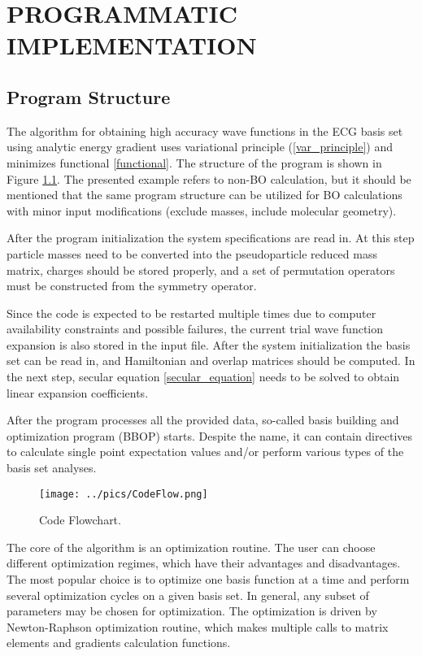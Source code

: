 \chapter{PROGRAMMATIC IMPLEMENTATION\label{prog}}

\section{Program Structure}

The algorithm for obtaining high accuracy wave functions
in the ECG basis set using analytic energy gradient
uses variational principle (\ref{var_principle})
and minimizes functional \ref{functional}.
The structure of the program is shown in Figure \ref{codeflow}.
The presented example refers to non-BO calculation,
but it should be mentioned that the same program structure can be 
utilized for BO calculations with minor input modifications
(exclude masses, include molecular geometry). 

After the program initialization the system specifications
are read in. At this step particle masses need to be 
converted into the pseudoparticle reduced mass matrix,
charges should be stored properly, and a set of 
permutation operators must be constructed from the
symmetry operator.

Since the code is expected to be restarted multiple times
due to computer availability constraints and possible
failures, the current trial wave function expansion
is also stored in the input file. After the system
initialization the basis set can be read in, and 
Hamiltonian and overlap matrices should be computed.
In the next step, secular equation \ref{secular_equation}
needs to be solved to obtain linear expansion coefficients.

After the program processes all the provided data, 
so-called basis building and optimization program (BBOP)
starts. Despite the name, it can contain directives to
calculate single point expectation values and/or perform
various types of the basis set analyses.

\begin{figure}[H]
\begin{center}
\texttt{[image: ../pics/CodeFlow.png]}
\caption[Code Flowchart]{Code Flowchart. \label{codeflow}}
\end{center}
\end{figure}

The core of the algorithm is an optimization routine.
The user can choose different optimization regimes,
which have their advantages and disadvantages. The most
popular choice is to optimize one basis function at a time
and perform several optimization cycles on a given basis
set. In general, any subset of parameters may be chosen for 
optimization. The optimization is driven by 
Newton-Raphson optimization routine, which makes multiple
calls to matrix elements and gradients calculation 
functions.

